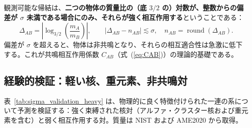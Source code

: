 \documentclass[11pt,a4paper]{article}
\theoremstyle{remark}
\begin{document}
	観測可能な帰結は、\textbf{二つの物体の質量比の（底 \(3/2\) の）対数が、整数からの偏差が \(\sigma\) 未満である場合にのみ、それらが強く相互作用する}ということである：
	\begin{equation}
		\Delta_{AB} = \left| \log_{3/2}\!\left(\frac{m_A}{m_B}\right) \right|,\qquad |\Delta_{AB} - n_{AB}| \lesssim \sigma,\quad n_{AB} = \operatorname{round}(\Delta_{AB}).
	\end{equation}
	偏差が \(\sigma\) を超えると、物体は非共鳴となり、それらの相互適合性は急激に低下する。これが共鳴相互作用係数 \(C_{AB}\)（式~(\ref{eq:CAB})）の理論的基礎である。
	
	\subsection{経験的検証：軽い核、重元素、非共鳴対}
	
	表~\ref{tab:sigma_validation_heavy} は、物理的に良く特徴付けられた一連の系について予測を検証する：強く束縛された核対（アルファ・クラスター核および重元素を含む）と弱く相互作用する対。質量は NIST および AME2020 から取得。
	
\end{document}
